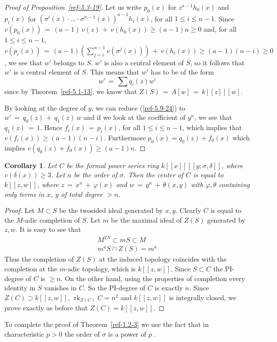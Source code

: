 \documentclass{amsart}
\numberwithin{equation}{section}
\def\rk{\operatorname {rk}}
\newtheorem{corollary}[lemma]{Corollary}
\theoremstyle{definition}
\theoremstyle{remark}
\begin{document}
\begin{proof}[Proof of Proposition~\ref{ref-5.3-19}]
 Let us write $p_{0}(x)$ for $z^{a-1}h_{0}(x)$ and $p_{i}(x)$ for  
 $(\sigma^{i}(x) \cdot \ldots 
    \cdot \sigma^{n-1}(x))^{a-1}h_{i}(x)$, for all $1 
    \leq i \leq n-1$.
     Since $v(p_{0}(x)) \,=\, (a-1) \, v(z) \,+\, v(h_{0}(x)) \geq 
    (a-1) n \geq 0$ and, for all $1 \leq i \leq n-1$, $v(p_{i}(x)) 
    \,=\, (a-1) \displaystyle{\left( \sum_{j=i}^{n-1} 
    v(\sigma^{j}(x)) \right)} \,+\, v(h_{i}(x)) \geq (a-1)(n-i) \geq 
    0$, we see that $w'$ belongs to $S$. $w'$ is also a central 
    element of $\overline{S}$, so it follows that $w'$ is a central 
    element of $S$.
     This means that $w'$ has to be of the form
    \begin{equation} \label{ref-5.9-24}
        w' \,=\, \sum q_{i}(z) w^{i}
    \end{equation}
    since by Theorem~\ref{ref-5.1-13}, we know that $Z(S) \,=\, 
    A[w] \,=\, k[[z]][w]$.
    
By looking at the degree of $y$, we can reduce (\ref{ref-5.9-24}) to 
    $w' \,=\, q_{0}(z) \,+\, q_{1}(z) \, w$ and if we look at the 
    coefficient of $y^{n}$, we see that $q_{1}(z) \,=\, 1$.
    Hence $f_{i}(x) \,=\, p_{i}(x)$, for all $1 \leq i \leq n-1$, 
    which implies that $v(f_{i}(x)) \geq (a-1)(n-i)$. Furthermore
    $p_0(x)=q_0(z)+f_0(x)$ which implies $v( q_0(z)+f_0(x))\ge (a-1)n$. 
\end{proof} 

\begin{corollary} \label{ref-5.5-25}
    Let $C$ be the formal power series ring 
    $k[[x]][[y;\sigma,\delta]]$, where  \mbox{$v(\delta(x)) \geq 3$}. Let $n$ 
    be the order of $\sigma$. Then the center of $C$ is equal to 
    $k[[z,w]]$, where $z \,=\, x^{n} \,+\, \varphi(x)$ and $w \,=\, 
    y^{n} \,+\, \theta(x,y)$ with $\varphi,\theta$ containing only 
    terms in $x$, $y$ of total degree $>n$.
\end{corollary}

\begin{proof}
Let $M\subset S$ be the twosided ideal generated by $x,y$. Clearly $C$
is equal to the $M$-adic completion of $S$. Let $m$ be the maximal
ideal of $Z(S)$ generated by $z,w$. It is easy to see that 
\begin{gather*}
M^{2N}\subset mS \subset M\\
m^aS\cap Z(S)=m^a
\end{gather*}
Thus the completion of  $Z(S)$ at the induced topology coincides with
the completion at the $m$-adic topology, which is $k[[z,w]]$.  Since
$S\subset C$ the PI-degree of $C$ is $\ge n$. On the other hand, using
the properties of completion every identity in $S$ vanishes in $C$. So
the PI-degree of $C$ is exactly $n$. Since $Z(C)\supset k[[z,w]]$,
$\rk_{Z(C)} C=n^2$  and  $k[[z,w]]$ is integrally closed, we prove
exactly as before that $Z(C)= k[[z,w]]$. 
\end{proof}
To complete the proof of  Theorem~\ref{ref-1.2-3} we use the fact that
in characteristic $p>0$
 the order of $\sigma$ is a power of $p$
\cite{SS1}.
\end{document}
